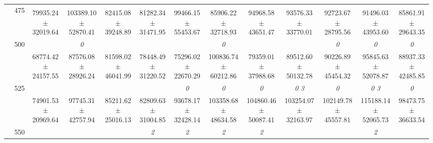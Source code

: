 \begin{table}[h]
{\begin{tabular}{
        ccccccccccccc}
 & \multirow{2}{*}{475}& \cellcolor[HTML]{EFEFEF} & \cellcolor[HTML]{EFEFEF} & \cellcolor[HTML]{EFEFEF} & \cellcolor[HTML]{EFEFEF} & \cellcolor[HTML]{EFEFEF} & \cellcolor[HTML]{EFEFEF} & \cellcolor[HTML]{EFEFEF} & \cellcolor[HTML]{EFEFEF} & \cellcolor[HTML]{EFEFEF} & \cellcolor[HTML]{EFEFEF} & \cellcolor[HTML]{EFEFEF}  \\ 
 & & \cellcolor[HTML]{EFEFEF} 79935.24 $\pm$ 32019.64& \cellcolor[HTML]{EFEFEF} 103389.10 $\pm$ 52870.41& \cellcolor[HTML]{EFEFEF} 82415.08 $\pm$ 39248.89& \cellcolor[HTML]{EFEFEF} 81282.34 $\pm$ 31471.95& \cellcolor[HTML]{EFEFEF} 99466.15 $\pm$ 55453.67& \cellcolor[HTML]{EFEFEF} 85906.22 $\pm$ 32718.93& \cellcolor[HTML]{EFEFEF} 94968.58 $\pm$ 43651.47& \cellcolor[HTML]{EFEFEF} 93576.33 $\pm$ 33770.01& \cellcolor[HTML]{EFEFEF} 92723.67 $\pm$ 28795.56& \cellcolor[HTML]{EFEFEF} 91496.03 $\pm$ 43953.60& \cellcolor[HTML]{EFEFEF} 85861.91 $\pm$ 29643.35 \\ 
 & \multirow{2}{*}{500}& & \textit{ 0 }& & & & \textit{ 0 }& & & \textit{ 0 }& \textit{ 0 }& \textit{ 0 } \\ 
 & & 68774.42 $\pm$ 24157.55& 87576.08 $\pm$ 28926.24& 81598.02 $\pm$ 46041.99& 78448.49 $\pm$ 31220.52& 75296.02 $\pm$ 22670.29& 100836.74 $\pm$ 60212.86& 79359.01 $\pm$ 37988.68& 89512.60 $\pm$ 50132.78& 90226.89 $\pm$ 45454.32& 95845.63 $\pm$ 52078.87& 88937.33 $\pm$ 42485.85 \\ 
 & \multirow{2}{*}{525}& \cellcolor[HTML]{EFEFEF} & \cellcolor[HTML]{EFEFEF} & \cellcolor[HTML]{EFEFEF} & \cellcolor[HTML]{EFEFEF} & \cellcolor[HTML]{EFEFEF} \textit{ 0 }& \cellcolor[HTML]{EFEFEF} \textit{ 0 }& \cellcolor[HTML]{EFEFEF} \textit{ 0 }& \cellcolor[HTML]{EFEFEF} \textit{ 0 3 }& \cellcolor[HTML]{EFEFEF} \textit{ 0 }& \cellcolor[HTML]{EFEFEF} \textit{ 0 3 }& \cellcolor[HTML]{EFEFEF} \textit{ 0 } \\ 
 & & \cellcolor[HTML]{EFEFEF} 74901.53 $\pm$ 20969.64& \cellcolor[HTML]{EFEFEF} 97745.31 $\pm$ 42757.94& \cellcolor[HTML]{EFEFEF} 85211.62 $\pm$ 25016.13& \cellcolor[HTML]{EFEFEF} 82809.63 $\pm$ 31004.85& \cellcolor[HTML]{EFEFEF} 93678.17 $\pm$ 32428.14& \cellcolor[HTML]{EFEFEF} 103358.68 $\pm$ 48634.58& \cellcolor[HTML]{EFEFEF} 104860.46 $\pm$ 50087.41& \cellcolor[HTML]{EFEFEF} 103254.07 $\pm$ 32163.97& \cellcolor[HTML]{EFEFEF} 102149.78 $\pm$ 45557.81& \cellcolor[HTML]{EFEFEF} 115188.14 $\pm$ 52065.73& \cellcolor[HTML]{EFEFEF} 98473.75 $\pm$ 36633.54 \\ 
 & \multirow{2}{*}{550}& & & & \textit{ 2 }& \textit{ 2 }& \textit{ 2 }& \textit{ 2 }& & & \textit{ 2 }&  \\ 

\end{tabular}}
\end{table}
